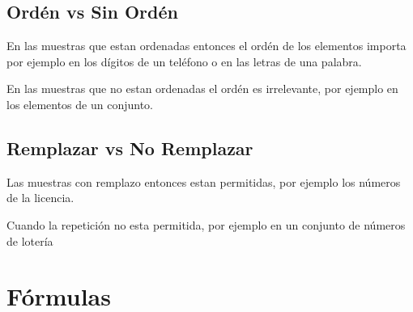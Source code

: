 \documentclass[12pt, fleqn]{report}                             %
\theoremstyle{break}                                            %
\begin{document}
            \subsection{Ordén vs Sin Ordén}

                En las muestras que estan ordenadas entonces el ordén de los elementos importa
                por ejemplo en los dígitos de un teléfono o en las letras de una palabra.

                En las muestras que no estan ordenadas el ordén es irrelevante, por ejemplo en los
                elementos de un conjunto.

            \subsection{Remplazar vs No Remplazar}

                Las muestras con remplazo entonces estan permitidas, por ejemplo los números de
                la licencia.

                Cuando la repetición no esta permitida, por ejemplo en un conjunto de números de lotería


        \clearpage
        \section{Fórmulas}
\end{document}
